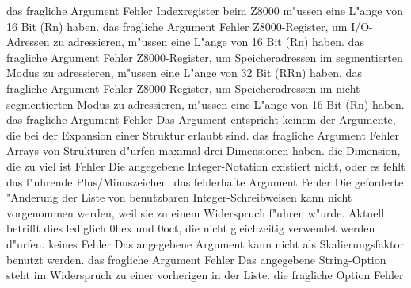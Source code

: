 \documentclass[12pt,a4paper,twoside]{report}
\begin{document}
\begin{description}
               {das fragliche Argument}
               {Fehler}
               {Indexregister beim Z8000 m"ussen eine L"ange von 16 Bit (Rn) haben.}
               {das fragliche Argument}
               {Fehler}
               {Z8000-Register, um I/O-Adressen zu adressieren, m"ussen eine L"ange von 16 Bit (Rn) haben.}
               {das fragliche Argument}
               {Fehler}
               {Z8000-Register, um Speicheradressen im segmentierten Modus zu adressieren, m"ussen
                eine L"ange von 32 Bit (RRn) haben.}
               {das fragliche Argument}
               {Fehler}
               {Z8000-Register, um Speicheradressen im nicht-segmentierten Modus zu adressieren, m"ussen
                eine L"ange von 16 Bit (Rn) haben.}
               {das fragliche Argument}
               {Fehler}
               {Das Argument entspricht keinem der Argumente, die bei der Expansion einer
                Struktur erlaubt sind.}
               {das fragliche Argument}
               {Fehler}
               {Arrays von Strukturen d"urfen maximal drei Dimensionen haben.}
               {die Dimension, die zu viel ist}
               {Fehler}
               {Die angegebene Integer-Notation existiert nicht, oder es fehlt das
                f"uhrende Plus/Minuszeichen.}
               {das fehlerhafte Argument}
               {Fehler}
               {Die geforderte "Anderung der Liste von benutzbaren Integer-Schreibweisen
                kann nicht vorgenommen werden, weil sie zu einem Widerspruch f"uhren
                w"urde.  Aktuell betrifft dies lediglich 0hex und 0oct, die nicht
                gleichzeitig verwendet werden d"urfen.}
               {keines}
               {Fehler}
               {Das angegebene Argument kann nicht als Skalierungsfaktor benutzt werden.}
               {das fragliche Argument}
               {Fehler}
               {Das angegebene String-Option steht im Widerspruch zu einer vorherigen in der Liste.}
               {die fragliche Option}
               {Fehler}

\end{description}
\end{document}
